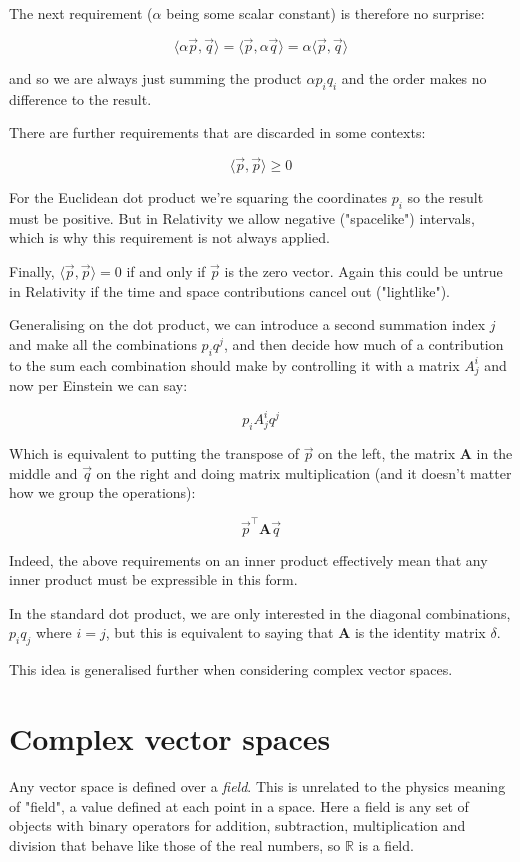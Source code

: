 The next requirement ($\alpha$ being some scalar constant) is therefore no surprise:

$$\langle \alpha \vec{p},\vec{q}\rangle = \langle \vec{p},\alpha \vec{q}\rangle = \alpha \langle \vec{p},\vec{q}\rangle$$

and so we are always just summing the product $\alpha p_i q_i$ and the order makes no difference to the result.

There are further requirements that are discarded in some contexts:

$$\langle \vec{p},\vec{p}\rangle \geq 0$$

For the Euclidean dot product we're squaring the coordinates $p_i$ so the result must be positive. But in Relativity we allow negative ("spacelike") intervals, which is why this requirement is not always applied.

Finally, $\langle \vec{p},\vec{p}\rangle = 0$ if and only if $\vec{p}$ is the zero vector. Again this could be untrue in Relativity if the time and space contributions cancel out ("lightlike").

Generalising on the dot product, we can introduce a second summation index $j$ and make all the combinations $p_iq^j$, and then decide how much of a contribution to the sum each combination should make by controlling it with a matrix $A^i_j$ and now per Einstein we can say:

$$p_i A^i_j q^j$$

Which is equivalent to putting the transpose of $\vec{p}$ on the left, the matrix $\mathbf{A}$ in the middle and $\vec{q}$ on the right and doing matrix multiplication (and it doesn't matter how we group the operations):

$$\vec{p}^\intercal\mathbf{A}\vec{q}$$

Indeed, the above requirements on an inner product effectively mean that any inner product must be expressible in this form.

In the standard dot product, we are only interested in the diagonal combinations, $p_i q_j$ where $i=j$, but this is equivalent to saying that $\mathbf{A}$ is the identity matrix $\delta$.

This idea is generalised further when considering complex vector spaces.

\section{Complex vector spaces}

Any vector space is defined over a \textit{field}. This is unrelated to the physics meaning of "field", a value defined at each point in a space. Here a field is any set of objects with binary operators for addition, subtraction, multiplication and division that behave like those of the real numbers, so $\mathbb{R}$ is a field.

